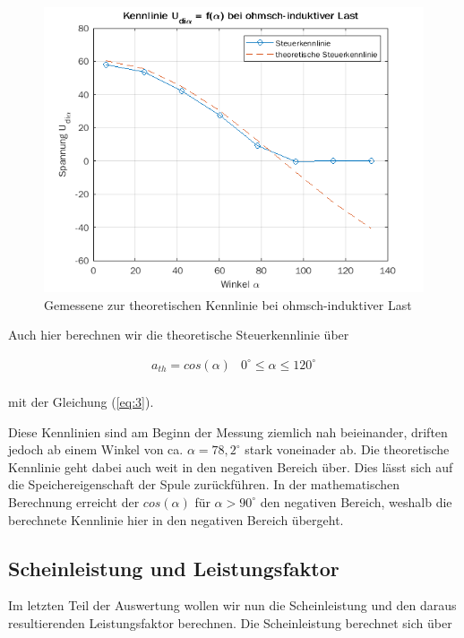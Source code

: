 \documentclass{article}
\begin{document}
\begin{figure}[h]
  \centering
  \includegraphics[width=.75\textwidth]{../assets/images/GEP2/udia_alpha_induk.png}
  \caption{Gemessene zur theoretischen Kennlinie bei ohmsch-induktiver Last}
  \label{fig:udiaalphainduk}
\end{figure}
Auch hier berechnen wir die theoretische Steuerkennlinie über

\begin{equation*}
  \label{eq:4}
  \begin{array}{ll}
    a_{th} = cos(\alpha) & 0^{\circ} \leq\alpha\leq 120^{\circ}\\
  \end{array}
\end{equation*}

mit der Gleichung (\ref{eq:3}).

Diese Kennlinien sind am Beginn der Messung ziemlich nah beieinander, driften jedoch ab einem Winkel von ca. $\alpha = 78,2^{\circ}$ stark voneinader ab. Die theoretische Kennlinie geht dabei auch weit in den negativen Bereich über. Dies lässt sich auf die Speichereigenschaft der Spule zurückführen. In der mathematischen Berechnung erreicht der $cos(\alpha)$ für $\alpha > 90^{\circ}$ den negativen Bereich, weshalb die berechnete Kennlinie hier in den negativen Bereich übergeht.

\subsection{Scheinleistung und Leistungsfaktor}
\label{sec:sche-und-leist}

Im letzten Teil der Auswertung wollen wir nun die Scheinleistung und den daraus resultierenden Leistungsfaktor berechnen. Die Scheinleistung berechnet sich über
\end{document}
